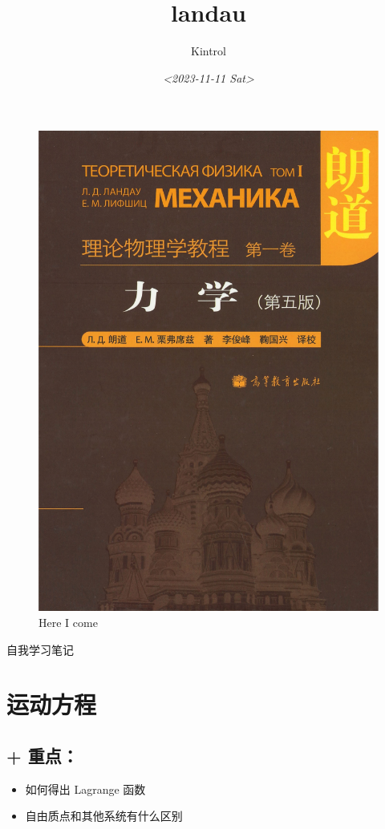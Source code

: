 \documentclass[11pt]{article}
\author{Kintrol}
\date{\textit{<2023-11-11 Sat>}}
\title{landau}
\begin{document}
\maketitle
\begin{figure}[htbp]
\centering
\includegraphics[width=.9\linewidth]{./img/front.pdf}
\caption{Here I come}
\end{figure}

自我学习笔记
\section{运动方程}
\label{sec:org492993d}
\subsection{+ 重点：}
\label{sec:orgbb272b9}
\begin{itemize}
\item 如何得出 Lagrange 函数
\item 自由质点和其他系统有什么区别
\end{itemize}
\end{document}
